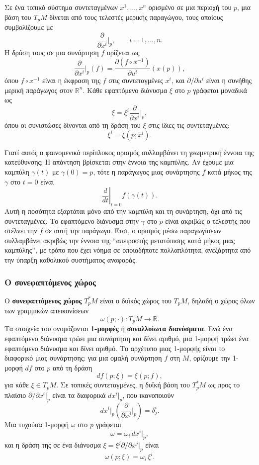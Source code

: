 \documentclass[12pt]{article}
\begin{document}
Σε ένα τοπικό σύστημα συντεταγμένων $x^1, \dots, x^n$ ορισμένο σε μια περιοχή του $p$, μια βάση του $T_pM$ δίνεται από τους τελεστές μερικής παραγώγου, τους οποίους συμβολίζουμε με
\[
\frac{\partial}{\partial x^i}\bigg|_p, \qquad i = 1, \dots, n.
\]
Η δράση τους σε μια συνάρτηση $f$ ορίζεται ως
\[
\frac{\partial}{\partial x^i}\bigg|_p (f) = \frac{\partial (f \circ x^{-1})}{\partial u^i}(x(p)),
\]
όπου $f \circ x^{-1}$ είναι η έκφραση της $f$ στις συντεταγμένες $x^i$, και $\partial / \partial u^i$ είναι η συνήθης μερική παράγωγος στον $\mathbb{R}^n$. Κάθε εφαπτόμενο διάνυσμα $\xi$ στο $p$ γράφεται μοναδικά ως
\[
\xi = \xi^i \frac{\partial}{\partial x^i}\bigg|_p,
\]
όπου οι συνιστώσες δίνονται από τη δράση του $\xi$ στις ίδιες τις συντεταγμένες:
\[
\xi^i = \xi(p; x^i).
\]

Γιατί αυτός ο φαινομενικά περίπλοκος ορισμός συλλαμβάνει τη γεωμετρική έννοια της κατεύθυνσης; Η απάντηση βρίσκεται στην έννοια της καμπύλης. Αν έχουμε μια καμπύλη $\gamma(t)$ με $\gamma(0) = p$, τότε η παράγωγος μιας συνάρτησης $f$ κατά μήκος της $\gamma$ στο $t=0$ είναι
\[
\left. \frac{d}{dt} \right|_{t=0} f(\gamma(t)).
\]
Αυτή η ποσότητα εξαρτάται μόνο από την καμπύλη και τη συνάρτηση, όχι από τις συντεταγμένες. Το εφαπτόμενο διάνυσμα στην $\gamma$ στο $p$ είναι ακριβώς ο τελεστής που στέλνει την $f$ σε αυτή την παράγωγο. Έτσι, ο ορισμός μέσω παραγωγίσεων συλλαμβάνει ακριβώς την έννοια της ``απειροστής μετατόπισης κατά μήκος μιας καμπύλης'', με τρόπο που έχει νόημα σε οποιαδήποτε πολλαπλότητα, ανεξάρτητα από την ύπαρξη καθολικού συστήματος αναφοράς.

\subsubsection{Ο συνεφαπτόμενος χώρος}

Ο \textbf{συνεφαπτόμενος χώρος} $T_p^*M$ είναι ο δυϊκός χώρος του $T_pM$, δηλαδή ο χώρος όλων των γραμμικών απεικονίσεων
\[
\omega(p; \cdot): T_pM \to \mathbb{R}.
\]
Τα στοιχεία του ονομάζονται \textbf{1-μορφές} ή \textbf{συναλλοίωτα διανύσματα}. Ενώ ένα εφαπτόμενο διάνυσμα τρώει μια συνάρτηση και δίνει αριθμό, μια 1-μορφή τρώει ένα εφαπτόμενο διάνυσμα και δίνει αριθμό. Το αρχέτυπο μιας 1-μορφής είναι το διαφορικό μιας συνάρτησης: για μια ομαλή συνάρτηση $f$ στη $M$, ορίζουμε την 1-μορφή $df$ στο $p$ από τη δράση
\[
df(p; \xi) = \xi(p; f),
\]
για κάθε $\xi \in T_pM$. Σε τοπικές συντεταγμένες, η δυϊκή βάση του $T_p^*M$ ως προς το πλαίσιο $\partial / \partial x^i|_p$ είναι τα διαφορικά $dx^i|_p$, που ικανοποιούν
\[
dx^i|_p \left( \frac{\partial}{\partial x^j}\bigg|_p \right) = \delta^i_j. \tag{0.6}
\]
Μια τυχούσα 1-μορφή $\omega$ στο $p$ γράφεται
\[
\omega = \omega_i \, dx^i|_p,
\]
και η δράση της σε ένα διάνυσμα $\xi = \xi^j \partial / \partial x^j|_p$ είναι
\[
\omega(p; \xi) = \omega_i \, \xi^i.
\]
\end{document}
